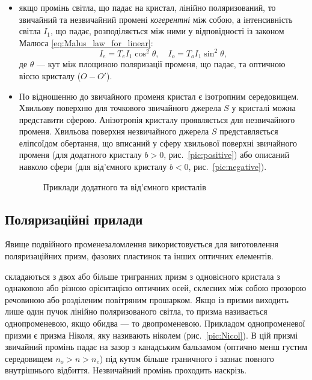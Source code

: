 \begin{itemize}
\item якщо промінь світла, що падає на кристал, лінійно поляризований, то
звичайний та незвичайний промені \emph{когерентні} між собою, а
інтенсивність світла
$ I_1 $, що падає, розподіляється між ними у
відповідності із законом Малюса \eqref{eq:Malus_law_for_linear}:
\begin{equation*}
    I_e = T_eI_1\cos^2\theta, \quad I_o = T_oI_1\sin^2\theta,
\end{equation*}
де $\theta$ --- кут між площиною поляризації променя, що падає, та оптичною
віссю кристалу ($ O-O' $).

\item По відношенню до звичайного променя кристал є ізотропним середовищем. Хвильову поверхню для точкового звичайного джерела $ S $ у кристалі можна представити сферою. Анізотропія кристалу проявляється для незвичайного променя. Хвильова поверхня незвичайного джерела $ S $ представляється еліпсоїдом обертання, що вписаний у сферу хвильової поверхні звичайного променя (для додатного кристалу $ b > 0 $, рис.~\ref{pic:positive}) або описаний навколо сфери (для від’ємного кристалу $ b < 0 $, рис.~\ref{pic:negative}).

\begin{figure}[h!]\centering

\caption{Приклади додатного та від'ємного кристалів}
\end{figure}


\end{itemize}

\subsection*{Поляризаційні прилади}


Явище подвійного променезаломлення використовується для виготовлення
поляризаційних призм, фазових пластинок та інших оптичних
елементів.

 складаються з двох або більше тригранних призм з одновісного кристала з однаковою або різною орієнтацією оптичних осей, склеєних між собою прозорою речовиною або розділеним повітряним прошарком. Якщо із призми виходить лише один пучок лінійно поляризованого світла, то призма називається однопроменевою, якщо обидва --- то двопроменевою. Прикладом однопроменевої призми є призма Ніколя, яку називають ніколем (рис.~\ref{pic:Nicol}). В цій призмі звичайний промінь падає на зазор з канадським бальзамом (оптично менш густим середовищем $n_o > n > n_e$) під кутом більше граничного і зазнає повного
внутрішнього відбиття. Незвичайний промінь проходить наскрізь.

